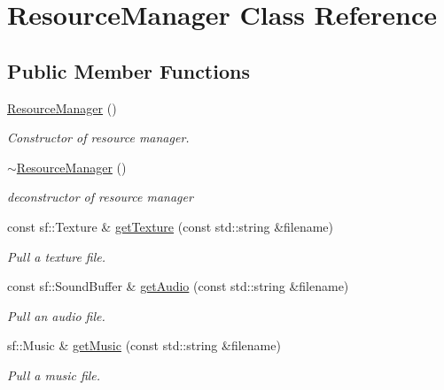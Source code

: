 \hypertarget{class_resource_manager}{}\section{Resource\+Manager Class Reference}
\label{class_resource_manager}
\subsection*{Public Member Functions}
\begin{DoxyCompactItemize}
\item 
\mbox{\label{class_resource_manager_a3b32babd2e81909bbd90d7f2d566fadb}} 
\hyperlink{class_resource_manager_a3b32babd2e81909bbd90d7f2d566fadb}{Resource\+Manager} ()
\begin{DoxyCompactList}\small\item\em Constructor of resource manager. \end{DoxyCompactList}\item 
\mbox{\label{class_resource_manager_a671c186e4630599e7e36d000c53eaf80}} 
\hyperlink{class_resource_manager_a671c186e4630599e7e36d000c53eaf80}{$\sim$\+Resource\+Manager} ()
\begin{DoxyCompactList}\small\item\em deconstructor of resource manager \end{DoxyCompactList}\item 
const sf\+::\+Texture \& \hyperlink{class_resource_manager_abdcc5ba3056bf5ecd282fd6a3249da67}{get\+Texture} (const std\+::string \&filename)
\begin{DoxyCompactList}\small\item\em Pull a texture file. \end{DoxyCompactList}\item 
const sf\+::\+Sound\+Buffer \& \hyperlink{class_resource_manager_a7804aec5b1d1c5c196db33c23eab4153}{get\+Audio} (const std\+::string \&filename)
\begin{DoxyCompactList}\small\item\em Pull an audio file. \end{DoxyCompactList}\item 
sf\+::\+Music \& \hyperlink{class_resource_manager_aae797e6ff05c541b9d880669d4817fb7}{get\+Music} (const std\+::string \&filename)
\begin{DoxyCompactList}\small\item\em Pull a music file. \end{DoxyCompactList}\item 

\end{DoxyCompactItemize}
